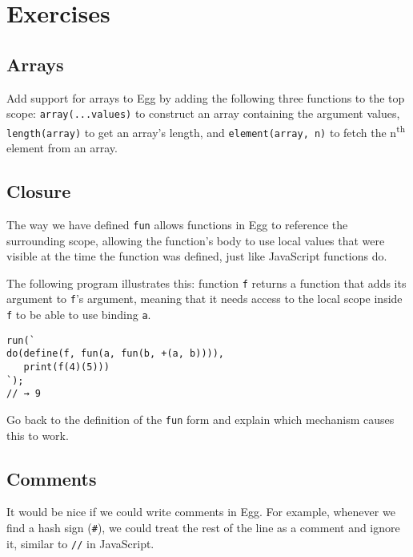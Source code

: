 \section{Exercises}

\subsection{Arrays}

Add support for arrays to Egg by adding the following three functions to the top scope: \lstinline`array(...values)` to construct an array containing the argument values, \lstinline`length(array)` to get an array's length, and \lstinline`element(array, n)` to fetch the n\textsuperscript{th} element from an array.

\subsection{Closure}

The way we have defined \lstinline`fun` allows functions in Egg to reference the surrounding scope, allowing the function's body to use local values that were visible at the time the function was defined, just like JavaScript functions do.

The following program illustrates this: function \lstinline`f` returns a function that adds its argument to \lstinline`f`'s argument, meaning that it needs access to the local scope inside \lstinline`f` to be able to use binding \lstinline`a`.

\begin{lstlisting}
run(`
do(define(f, fun(a, fun(b, +(a, b)))),
   print(f(4)(5)))
`);
// → 9
\end{lstlisting}
\noindent

Go back to the definition of the \lstinline`fun` form and explain which mechanism causes this to work.

\subsection{Comments}

It would be nice if we could write comments in Egg. For example, whenever we find a hash sign (\lstinline`#`), we could treat the rest of the line as a comment and ignore it, similar to \lstinline`//` in JavaScript.

